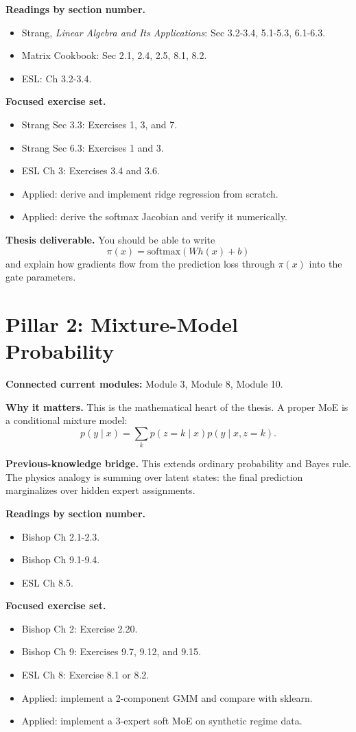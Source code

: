 \documentclass[11pt]{article}
\begin{document}
\textbf{Readings by section number.}
\begin{itemize}
  \item Strang, \emph{Linear Algebra and Its Applications}: Sec 3.2-3.4, 5.1-5.3, 6.1-6.3.
  \item Matrix Cookbook: Sec 2.1, 2.4, 2.5, 8.1, 8.2.
  \item ESL: Ch 3.2-3.4.
\end{itemize}

\textbf{Focused exercise set.}
\begin{itemize}
  \item Strang Sec 3.3: Exercises 1, 3, and 7.
  \item Strang Sec 6.3: Exercises 1 and 3.
  \item ESL Ch 3: Exercises 3.4 and 3.6.
  \item Applied: derive and implement ridge regression from scratch.
  \item Applied: derive the softmax Jacobian and verify it numerically.
\end{itemize}

\textbf{Thesis deliverable.} You should be able to write
\[
\pi(x) = \mathrm{softmax}(Wh(x)+b)
\]
and explain how gradients flow from the prediction loss through \(\pi(x)\) into the gate parameters.

\section{Pillar 2: Mixture-Model Probability}

\textbf{Connected current modules:} Module 3, Module 8, Module 10.

\textbf{Why it matters.} This is the mathematical heart of the thesis. A proper MoE is a conditional mixture model:
\[
p(y \mid x) = \sum_k p(z=k \mid x)p(y \mid x,z=k).
\]

\textbf{Previous-knowledge bridge.} This extends ordinary probability and Bayes rule. The physics analogy is summing over latent states: the final prediction marginalizes over hidden expert assignments.

\textbf{Readings by section number.}
\begin{itemize}
  \item Bishop Ch 2.1-2.3.
  \item Bishop Ch 9.1-9.4.
  \item ESL Ch 8.5.
\end{itemize}

\textbf{Focused exercise set.}
\begin{itemize}
  \item Bishop Ch 2: Exercise 2.20.
  \item Bishop Ch 9: Exercises 9.7, 9.12, and 9.15.
  \item ESL Ch 8: Exercise 8.1 or 8.2.
  \item Applied: implement a 2-component GMM and compare with sklearn.
  \item Applied: implement a 3-expert soft MoE on synthetic regime data.
\end{itemize}
\end{document}
